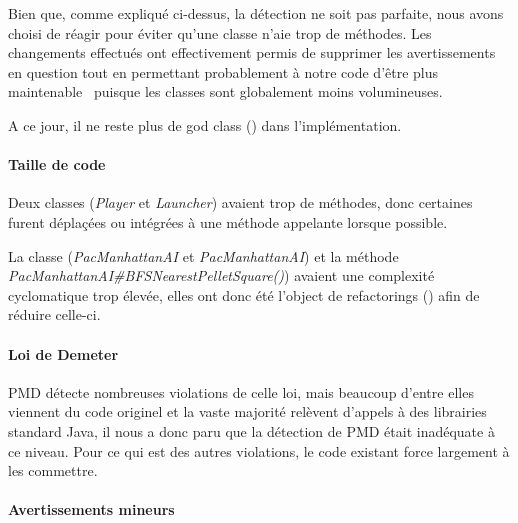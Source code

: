 \documentclass[12pt, openany]{report}
\begin{document}
Bien que, comme expliqué ci-dessus, la détection ne soit pas parfaite, nous avons choisi de réagir pour éviter qu'une classe n'aie trop de méthodes. Les changements effectués ont effectivement permis de supprimer les avertissements en question tout en permettant probablement à notre code d'être plus \og maintenable \fg \, puisque les classes sont globalement moins volumineuses.

A ce jour, il ne reste plus de \og god class \fg() dans l'implémentation.


\paragraph{Taille de code}

Deux classes (\mbox{\textit{Player}} et \mbox{\textit{Launcher}}) avaient trop de méthodes, donc certaines furent déplaçées ou intégrées à une méthode appelante lorsque possible.

La classe (\mbox{\textit{PacManhattanAI}} et \mbox{\textit{PacManhattanAI}}) et la méthode \mbox{\textit{PacManhattanAI\#BFSNearestPelletSquare()}}) avaient une complexité cyclomatique trop élevée, elles ont donc été l'object de \og refactorings \fg() afin de réduire celle-ci.

\paragraph{Loi de Demeter}

PMD détecte nombreuses violations de celle loi, mais beaucoup d'entre elles viennent du code originel et la vaste majorité relèvent d'appels à des librairies standard Java, il nous a donc paru que la détection de PMD était inadéquate à ce niveau.
Pour ce qui est des autres violations, le code existant force largement à les commettre.

\paragraph{Avertissements mineurs}
\end{document}
